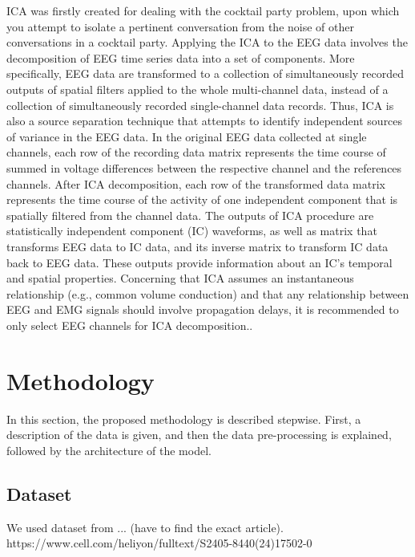 \documentclass[12pt,a4paper,titlepage,openany]{report}
\begin{document}
ICA was ﬁrstly created for dealing with the cocktail party problem, upon which you attempt to isolate a pertinent conversation from the noise of other conversations in a cocktail party. Applying the ICA to the EEG data involves the decomposition of EEG time series data into a set of components. More speciﬁcally, EEG data are transformed to a collection of simultaneously recorded outputs of spatial ﬁlters applied to the whole multi-channel data, instead of a collection of simultaneously recorded single-channel data records. Thus, ICA is also a source separation technique that attempts to identify independent sources of variance in the EEG data. 
In the original EEG data collected at single channels, each row of the recording data matrix represents the time course of summed in voltage differences between the respective channel and the references channels. 
After ICA decomposition, each row of the transformed data matrix represents the time course of the activity of one independent component that is spatially ﬁltered from the channel data. 
The outputs of ICA procedure are statistically independent component (IC) waveforms, as well as matrix that transforms EEG data to IC data, and its inverse matrix to transform IC data back to EEG data. 
These outputs provide information about an IC’s temporal and spatial properties. Concerning that ICA assumes an instantaneous relationship (e.g., common volume conduction) and that any relationship between EEG and EMG signals should involve propagation delays, it is recommended to only select EEG channels for ICA decomposition.\cite{makkar2023}.



\chapter{Methodology}
\thispagestyle{fancy}

In this section, the proposed methodology is described stepwise. First, a description of the data is given, and then the data pre-processing is explained, followed by the architecture of the model.

\section{Dataset}

We used dataset from ... (have to find the exact article). https://www.cell.com/heliyon/fulltext/S2405-8440(24)17502-0
\end{document}
